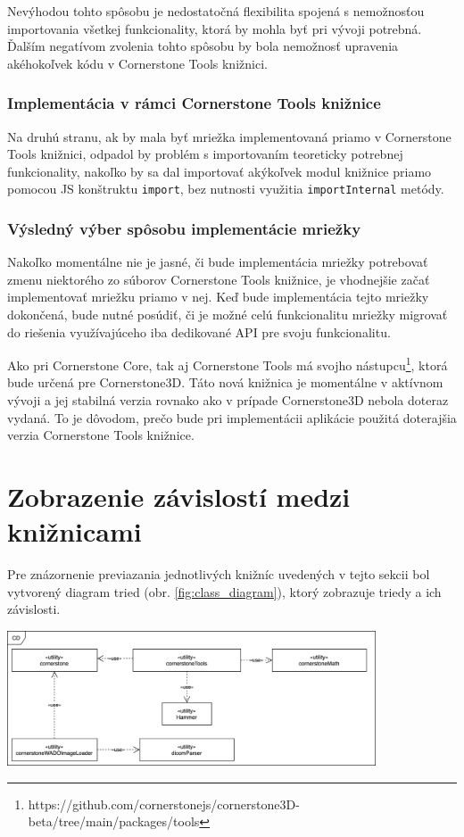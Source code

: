 Nevýhodou tohto spôsobu je nedostatočná flexibilita spojená s nemožnosťou importovania všetkej funkcionality, ktorá by mohla byť pri vývoji potrebná. Ďalším negatívom zvolenia tohto spôsobu by bola nemožnosť upravenia akéhokoľvek kódu v Cornerstone Tools knižnici.

\clearpage

\subsubsection {Implementácia v rámci Cornerstone Tools knižnice}
Na druhú stranu, ak by mala byť mriežka implementovaná priamo v Cornerstone Tools knižnici, odpadol by problém s importovaním teoreticky potrebnej funkcionality, nakoľko by sa dal importovať akýkoľvek modul knižnice priamo pomocou JS konštruktu \texttt{import}, bez nutnosti využitia \texttt{importInternal} metódy.

\subsubsection {Výsledný výber spôsobu implementácie mriežky}
Nakoľko momentálne nie je jasné, či bude implementácia mriežky potrebovať zmenu niektorého zo súborov Cornerstone Tools knižnice, je vhodnejšie začať implementovať mriežku priamo v nej. Keď bude implementácia tejto mriežky dokončená, bude nutné posúdiť, či je možné celú funkcionalitu mriežky migrovať do riešenia využívajúceho iba dedikované API pre svoju funkcionalitu.

Ako pri Cornerstone Core, tak aj Cornerstone Tools má svojho nástupcu\footnote{https://github.com/cornerstonejs/cornerstone3D-beta/tree/main/packages/tools}, ktorá bude určená pre Cornerstone3D. Táto nová knižnica je momentálne v aktívnom vývoji a jej stabilná verzia rovnako ako v prípade Cornerstone3D nebola doteraz vydaná. To je dôvodom, prečo bude pri implementácii aplikácie použitá doterajšia verzia Cornerstone Tools knižnice.


\section {Zobrazenie závislostí medzi knižnicami}\label{dependency_graph}
Pre znázornenie previazania jednotlivých knižníc uvedených v tejto sekcii bol vytvorený diagram tried (obr. \ref{fig:class_diagram}), ktorý zobrazuje triedy a ich závislosti.

\begin {center}
        \centering
        \includegraphics[height=4cm]{media/graphs/class_diagram.png}
        \captionsetup{justification=centering}
        \label{fig:class_diagram}
\end {center}

